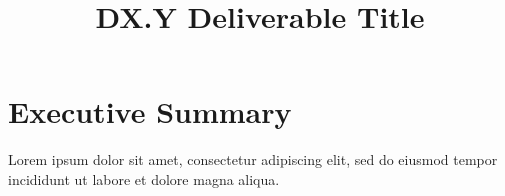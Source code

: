 \documentclass{CSSRforAfrica}
\begin{document}



\title{DX.Y Deliverable Title}    %

\leadpartner{ }                        %
\partner{}                                %




\maketitle
 

\section*{Executive Summary}
\label{executive_summary}
 
Lorem ipsum dolor sit amet, consectetur adipiscing elit, sed do eiusmod tempor incididunt ut labore et dolore magna aliqua. 

\newpage
 
 
\pagebreak
\tableofcontents
\newpage
\end{document}
